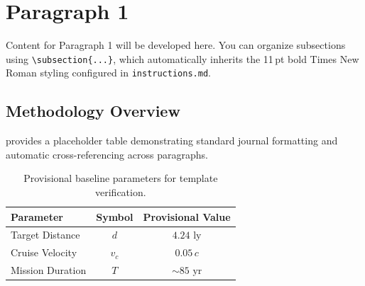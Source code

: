 \section{Paragraph 1}
\label{sec:paragraph_1}

Content for Paragraph 1 will be developed here. You can organize subsections
using \texttt{\textbackslash subsection\{...\}}, which automatically inherits
the 11\,pt bold Times New Roman styling configured in \texttt{instructions.md}.

\subsection{Methodology Overview}
\label{subsec:methodology}

 provides a placeholder table demonstrating
standard journal formatting and automatic cross-referencing across paragraphs.

\begin{table}[htbp]
  \centering
  \caption{Provisional baseline parameters for template verification.}
  \label{tab:sample_parameters}
  \begin{tabular}{@{}lcc@{}}
    \toprule
    Parameter & Symbol & Provisional Value \\
    \midrule
    Target Distance & $d$ & $4.24\text{ ly}$ \\
    Cruise Velocity & $v_c$ & $0.05\,c$ \\
    Mission Duration & $T$ & $\sim 85\text{ yr}$ \\
    \bottomrule
  \end{tabular}
\end{table}
